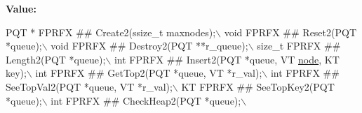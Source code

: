 {\bfseries Value\+:}
\begin{DoxyCode}
PQT *  FPRFX ## Create2(ssize\_t maxnodes);\(\backslash\)
  void   FPRFX ## Reset2(PQT *queue);\(\backslash\)
  void   FPRFX ## Destroy2(PQT **r\_queue);\(\backslash\)
  size\_t FPRFX ## Length2(PQT *queue);\(\backslash\)
  int    FPRFX ## Insert2(PQT *queue, VT \hyperlink{a00611_adf51fe9945b6ca147057cc27ff639d0f}{node}, KT key);\(\backslash\)
  int    FPRFX ## GetTop2(PQT *queue, VT *r\_val);\(\backslash\)
  int    FPRFX ## SeeTopVal2(PQT *queue, VT *r\_val);\(\backslash\)
  KT     FPRFX ## SeeTopKey2(PQT *queue);\(\backslash\)
  int    FPRFX ## CheckHeap2(PQT *queue);\(\backslash\)
\end{DoxyCode}
